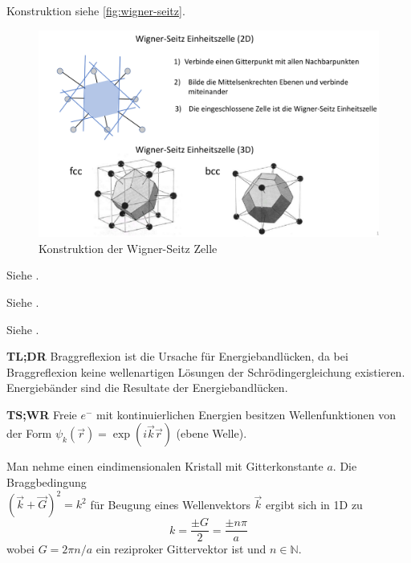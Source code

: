 Konstruktion siehe \autoref{fig:wigner-seitz}.
\begin{figure}[H]
    \centering
    \includegraphics[width=0.8\linewidth]{resources/15-06-2015/q33.png}
    \caption{Konstruktion der Wigner-Seitz Zelle}
    \label{fig:wigner-seitz}
\end{figure}

\label{q:34}

Siehe .

\label{q:35}

Siehe .

\label{q:36}

Siehe .

\label{q:37}

\textbf{TL;DR} Braggreflexion ist die Ursache für Energiebandlücken, da bei Braggreflexion keine wellenartigen Lösungen der Schrödingergleichung existieren.
Energiebänder sind die Resultate der Energiebandlücken.

\textbf{TS;WR} Freie $e^-$ mit kontinuierlichen Energien besitzen Wellenfunktionen von der Form $\psi_{k}(\vec{r}) = \exp(i\vec{k}\vec{r})$ (ebene Welle).

Man nehme einen eindimensionalen Kristall mit Gitterkonstante $a$.
Die Braggbedingung\\$\left(\vec{k} + \vec{G}\right)^2 = k^2$ für Beugung eines Wellenvektors $\vec{k}$ ergibt sich in 1D zu
\begin{equation}
    k = \frac{\pm G}{2} = \frac{\pm n \pi}{a}
\end{equation}
wobei $G = 2\pi n/a$ ein reziproker Gittervektor ist und $n \in \mathbb{N}$.

